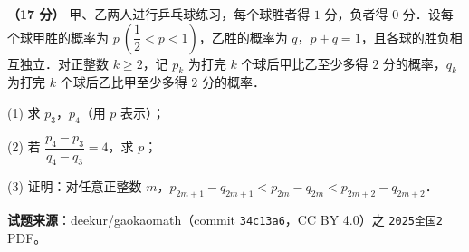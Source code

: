 \begin{question}
\textbf{（17 分）} 甲、乙两人进行乒乓球练习，每个球胜者得 $1$ 分，负者得 $0$ 分．设每个球甲胜的概率为 $p\ \left(\dfrac12<p<1\right)$，乙胜的概率为 $q$，$p+q=1$，且各球的胜负相互独立．对正整数 $k\ge 2$，记 $p_k$ 为打完 $k$ 个球后甲比乙至少多得 $2$ 分的概率，$q_k$ 为打完 $k$ 个球后乙比甲至少多得 $2$ 分的概率．

  (1) 求 $p_3$，$p_4$（用 $p$ 表示）；

  (2) 若 $\dfrac{p_4-p_3}{q_4-q_3}=4$，求 $p$；

  (3) 证明：对任意正整数 $m$，$p_{2m+1}-q_{2m+1}<p_{2m}-q_{2m}<p_{2m+2}-q_{2m+2}$．

\par\medskip

\begin{gktip}
\textbf{试题来源}：deekur/gaokaomath（commit \texttt{34c13a6}，CC BY 4.0）之 \texttt{2025全国2} PDF。
\end{gktip}

\end{question}